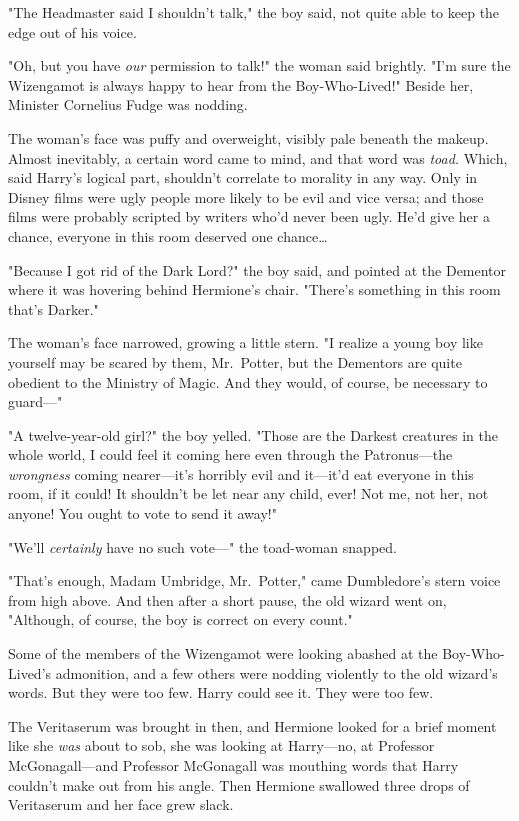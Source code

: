 "The Headmaster said I shouldn't talk," the boy said, not quite able
to keep the edge out of his voice.

"Oh, but you have \emph{our} permission to talk!" the woman said brightly. "I'm
sure the Wizengamot is always happy to hear from the Boy-Who-Lived!" Beside
her, Minister Cornelius Fudge was nodding.

The woman's face was puffy and overweight, visibly pale beneath the makeup.
Almost inevitably, a certain word came to mind, and that word was \emph{toad.}
Which, said Harry's logical part, shouldn't correlate to morality in any way.
Only in Disney films were ugly people more likely to be evil and vice versa;
and those films were probably scripted by writers who'd never been ugly. He'd
give her a chance, everyone in this room deserved one chance{\ldots}

"Because I got rid of the Dark Lord?" the boy said, and pointed at the Dementor
where it was hovering behind Hermione's chair. "There's something in this room
that's Darker."

The woman's face narrowed, growing a little stern. "I realize a young boy like
yourself may be scared by them, Mr.~Potter, but the Dementors are quite
obedient to the Ministry of Magic. And they would, of course, be necessary to
guard---"

"A twelve-year-old girl?" the boy yelled. "Those are the Darkest creatures in
the whole world, I could feel it coming here even through the Patronus---the
\emph{wrongness} coming nearer---it's horribly evil and it---it'd eat everyone
in this room, if it could! It shouldn't be let near any child, ever! Not me,
not her, not anyone! You ought to vote to send it away!"

"We'll \emph{certainly} have no such vote---" the toad-woman snapped.

"That's enough, Madam Umbridge, Mr.~Potter," came Dumbledore's stern voice from
high above. And then after a short pause, the old wizard went on, "Although, of
course, the boy is correct on every count."

Some of the members of the Wizengamot were looking abashed at the
Boy-Who-Lived's admonition, and a few others were nodding violently to the old
wizard's words. But they were too few. Harry could see it. They were too few.

The Veritaserum was brought in then, and Hermione looked for a brief moment
like she \emph{was} about to sob, she was looking at Harry---no, at Professor
McGonagall---and Professor McGonagall was mouthing words that Harry couldn't
make out from his angle. Then Hermione swallowed three drops of Veritaserum and
her face grew slack.

